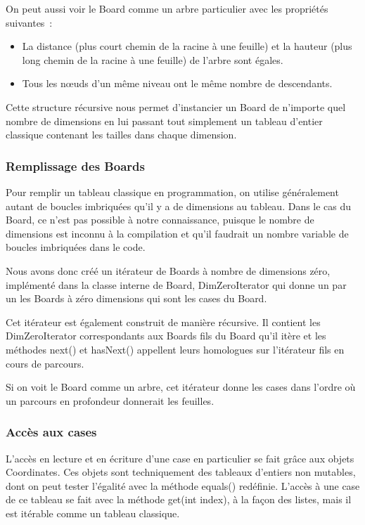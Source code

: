 	On peut aussi voir le Board comme un arbre particulier avec les propriétés suivantes~: \newline
		\begin{itemize}
			\item La distance (plus court chemin de la racine à une feuille) et la hauteur (plus long chemin de la racine à une feuille) de l'arbre sont égales.\newline
			\item Tous les nœuds d'un même niveau ont le même nombre de descendants.
		\end{itemize}

	Cette structure récursive nous permet d'instancier un Board de n'importe quel nombre de dimensions en lui passant tout simplement un tableau d'entier classique contenant les tailles dans chaque dimension.

	\subsubsection{Remplissage des Boards}

	Pour remplir un tableau classique en programmation, on utilise généralement autant de boucles imbriquées qu'il y a de dimensions au tableau. Dans le cas du Board, ce n'est pas possible à notre connaissance, puisque le nombre de dimensions est inconnu à la compilation et qu'il faudrait un nombre variable de boucles imbriquées dans le code.\newline
	
	Nous avons donc créé un itérateur de Boards à nombre de dimensions zéro, implémenté dans la classe interne de Board, DimZeroIterator qui donne un par un les Boards à zéro dimensions qui sont les cases du Board. \newline

	Cet itérateur est également construit de manière récursive. Il contient les DimZeroIterator correspondants aux Boards fils du Board qu'il itère et les méthodes next() et hasNext() appellent leurs homologues sur l'itérateur fils en cours de parcours.

	Si on voit le Board comme un arbre, cet itérateur donne les cases dans l'ordre où un parcours en profondeur donnerait les feuilles.

	\subsubsection{Accès aux cases}

	L'accès en lecture et en écriture d'une case en particulier se fait grâce aux objets Coordinates.
Ces objets sont techniquement des tableaux d'entiers non mutables, dont on peut tester l'égalité avec la méthode equals() redéfinie. L'accès à une case de ce tableau se fait avec la méthode get(int index), à la façon des listes, mais il est itérable comme un tableau classique.\newline

